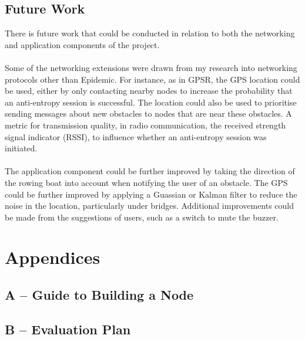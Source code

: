 \documentclass[12pt,a4paper]{report}
\begin{document}
\section{Future Work}
There is future work that could be conducted in relation to both the networking and application components of the project. \\ \\
Some of the networking extensions were drawn from my research into networking protocols other than Epidemic. For instance, as in GPSR, the GPS location could be used, either by only contacting nearby nodes to increase the probability that an anti-entropy session is successful. The location could also be used to prioritise sending messages about new obstacles to nodes that are near these obstacles.  A metric for transmission quality, in radio communication, the received strength signal indicator (RSSI), to influence whether an anti-entropy session was initiated. \\ \\ 
The application component could be further improved by taking the direction of the rowing boat into account when notifying the user of an obstacle. The GPS could be further improved by applying a Guassian or Kalman filter to reduce the noise in the location, particularly under bridges. Additional improvements could be made from the suggestions of users, such as a switch to mute the buzzer. 






\chapter*{Appendices}

\section*{A -- Guide to Building a Node}
\label{appendixA}
\setcounter{chapter}{0}
\setcounter{figure}{0}

\newpage
\section*{B -- Evaluation Plan}
\label{appendixB}
\setcounter{figure}{0}

\end{document}

